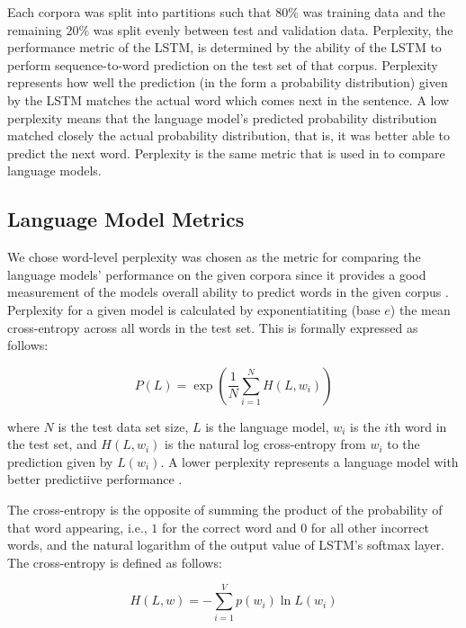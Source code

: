 \documentclass{article}
\begin{document}

Each corpora was split into partitions such that $80\%$ was training data
and the remaining $20\%$ was split evenly between test and validation
data. Perplexity, the performance metric of the LSTM, is determined by the
ability of the LSTM to perform sequence-to-word prediction on the test
set of that corpus. Perplexity represents how well the prediction (in the
form a probability distribution) given by the LSTM matches the actual
word which comes next in the sentence. A low perplexity means that the
language model's predicted probability distribution matched closely the
actual probability distribution, that is, it was better able to predict
the next word. Perplexity is the same metric that is used in
\citet{LSTMArticle} to compare language models.

\subsection{Language Model Metrics}

We chose word-level perplexity was chosen as the metric for comparing the
language models' performance on the given corpora since it provides
a good measurement of the models overall ability to predict words
in the given corpus \cite{sundermeyer2015feedforward}. 
Perplexity for a given model is calculated
by exponentiatiting (base $e$) the mean
cross-entropy across all words in the test set. This is formally
expressed as follows:

\begin{equation}
\label{perplexity}
    P(L) = \exp\left(\frac{1}{N}\sum^{N}_{i=1} H(L,w_i)\right)
\end{equation}

where $N$ is the test data set size, $L$ is the language model, $w_i$
is the $i$th word in the test set, and $H(L, w_i)$ is the natural log
cross-entropy from $w_i$ to the prediction given by $L(w_i)$. A lower
perplexity represents a language model with better predictiive
performance \cite{wang2016parallel}.

The cross-entropy is the opposite of summing the
product of the probability of that word appearing, i.e., $1$ for the
correct word and $0$ for all other incorrect words, and the
natural logarithm of the output value of LSTM's softmax layer.
The cross-entropy is defined as follows:

\begin{equation}
\label{cross-entropy}
    H(L,w) = - \sum_{i=1}^V p(w_i) \ln L(w_i)
\end{equation}
\end{document}
